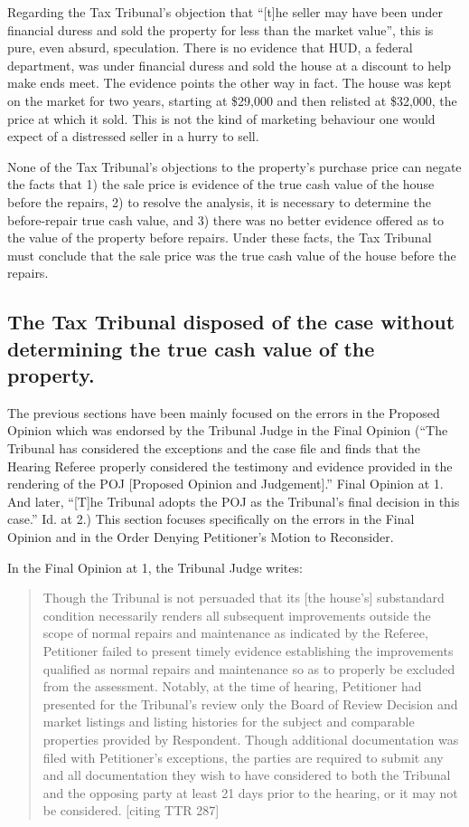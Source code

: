 \documentclass[12pt,\documentclassflag]{michiganCourtOfAppealsBrief}
\def\mathieuGast{\pincite[l]{MCL}{211.27(2)}}
\begin{document}
Regarding the Tax Tribunal's objection that ``[t]he seller may have been under financial duress and sold the property for less than the market value'', this is pure, even absurd, speculation. There is no evidence that HUD, a federal department, was under financial duress and sold the house at a discount to help make ends meet. The evidence points the other way in fact. The house was kept on the market for two years, starting at \$29,000 and then relisted at \$32,000, the price at which it sold. This is not the kind of marketing behaviour one would expect of a distressed seller in a hurry to sell.

None of the Tax Tribunal's objections to the property's purchase price can negate the facts that 1) the sale price is evidence of the true cash value of the house before the repairs, 2) to resolve the \mathieuGast analysis, it is necessary to determine the before-repair true cash value, and 3) there was no better evidence offered as to the value of the property before repairs. Under these facts, the Tax Tribunal must conclude that the sale price was the true cash value of the house before the repairs.

\subsection{The Tax Tribunal disposed of the case without determining the true cash value of the property.}

The previous sections have been mainly focused on the errors in the Proposed Opinion which was endorsed by the Tribunal Judge in the Final Opinion (``The Tribunal has considered the exceptions and the case file and finds that the Hearing Referee properly considered the testimony and evidence provided in the rendering of the POJ [Proposed Opinion and Judgement].'' Final Opinion at 1. And later, ``[T]he Tribunal adopts the POJ as the Tribunal's final decision in this case.'' Id. at 2.) This section focuses specifically on the errors in the Final Opinion and in the Order Denying Petitioner's Motion to Reconsider.

In the Final Opinion at 1, the Tribunal Judge writes:

\begin{quote}
Though the Tribunal is not persuaded that its [the house's] substandard condition necessarily renders all subsequent improvements outside the scope of normal repairs and maintenance as indicated by the Referee, Petitioner failed to present timely evidence establishing the improvements qualified as normal repairs and maintenance so as to properly be excluded from the assessment. Notably, at the time of hearing, Petitioner had presented for the Tribunal's review only the Board of Review Decision and market listings and listing histories for the subject and comparable properties provided by Respondent. Though additional documentation was filed with Petitioner's exceptions, the parties are required to submit any and all documentation they wish to have considered to both the Tribunal and the opposing party at least 21 days prior to the hearing, or it may not be considered. [citing TTR 287]
\end{quote}
\end{document}
